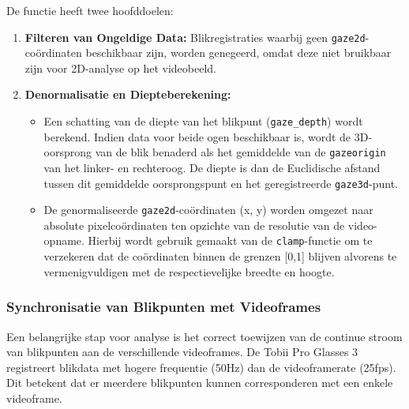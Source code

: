 De functie heeft twee hoofddoelen:
\begin{enumerate}
  \item \textbf{Filteren van Ongeldige Data:} Blikregistraties waarbij geen \texttt{gaze2d}-coördinaten beschikbaar zijn, 
  worden genegeerd, omdat deze niet bruikbaar zijn voor 2D-analyse op het videobeeld.
  \item \textbf{Denormalisatie en Diepteberekening:}
    \begin{itemize}
      \item Een schatting van de diepte van het blikpunt (\texttt{gaze\_depth}) wordt berekend. 
        Indien data voor beide ogen beschikbaar is, wordt de 3D-oorsprong van de blik benaderd als 
        het gemiddelde van de \texttt{gazeorigin} van het linker- en rechteroog. 
        De diepte is dan de Euclidische afstand tussen dit gemiddelde oorsprongspunt en het geregistreerde \texttt{gaze3d}-punt.
      \item De genormaliseerde \texttt{gaze2d}-coördinaten (x, y) worden omgezet naar absolute pixelcoördinaten 
        ten opzichte van de resolutie van de video-opname. 
        Hierbij wordt gebruik gemaakt van de \texttt{clamp}-functie om te verzekeren dat de coördinaten 
        binnen de grenzen [0,1] blijven alvorens te vermenigvuldigen met de respectievelijke breedte en hoogte.
    \end{itemize}
\end{enumerate}

\subsubsection{Synchronisatie van Blikpunten met Videoframes}

Een belangrijke stap voor analyse is het correct toewijzen van de continue stroom van blikpunten aan de verschillende videoframes.
De Tobii Pro Glasses 3 registreert blikdata met hogere frequentie (50Hz) dan de videoframerate (25fps).
Dit betekent dat er meerdere blikpunten kunnen corresponderen met een enkele videoframe.

